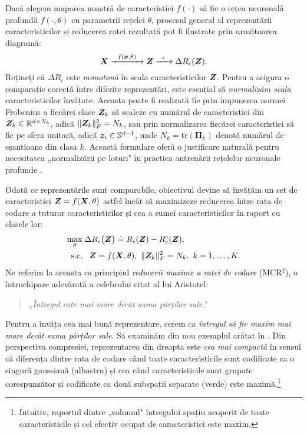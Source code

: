 \documentclass[../../book-main_ro.tex]{subfiles}
\begin{document}
Dacă alegem maparea noastră de caracteristici $f(\cdot)$ să fie o rețea neuronală profundă $f(\cdot,\theta)$ cu parametrii rețelei $\theta$, procesul general al reprezentării caracteristicilor și reducerea ratei rezultată pot fi ilustrate prin următoarea diagramă:
\begin{equation}
	\bm{X}
	\xrightarrow{\hspace{2mm} f(\bm{x}, \theta)\hspace{2mm}} \bm{Z}  \xrightarrow{\hspace{2mm} \epsilon \hspace{2mm}} \Delta R_{\epsilon}(\bm{Z}).
	\label{chap4-eqn:flow}
\end{equation}
Rețineți că $\Delta R_{\epsilon}$ este {\em monotonă} în scala caracteristicilor $\bm{Z}$. Pentru a asigura o comparație corectă între diferite reprezentări, este esențial să {\em normalizăm scala} caracteristicilor învățate. Aceasta poate fi realizată fie prin impunerea normei Frobenius a fiecărei clase $\bm{Z}_k$ să scaleze cu numărul de caracteristici din $\bm{Z}_k \in \mathbb R^{d \times N_k}$, adică $\|\bm{Z}_k\|_F^2 = N_k$, sau prin normalizarea fiecărei caracteristici să fie pe sfera unitară, adică $\bm{z}_i \in \mathbb{S}^{d-1}$, unde $N_k=\mathrm{tr}(\bm \Pi_k)$ denotă numărul de eșantioane din clasa $k$. Această formulare oferă o justificare naturală pentru necesitatea „normalizării pe loturi" în practica antrenării rețelelor neuronale profunde \cite{ioffe2015batch}.

Odată ce reprezentările sunt comparabile, obiectivul devine să învățăm un set de caracteristici $\bm{Z} = f(\bm{X}, \theta)$ astfel încât să maximizeze reducerea între rata de codare a tuturor caracteristicilor și cea a sumei caracteristicilor în raport cu clasele lor:
\begin{equation}
	\begin{aligned}
		\max_{\theta } & \;  \Delta R_{\epsilon}\big(\bm{Z} \big) \doteq R_{\epsilon}(\bm{Z}) - R_{\epsilon}^c(\bm{Z} ), \\
		\mbox{s.c.} & \ \ \, \bm{Z} = f(\bm X, \theta),\  \|\bm{Z}_k\|_F^2 = N_k,\ k=1,\dots,K. 
	\end{aligned}
	\label{eqn:maximal-rate-reduction}
\end{equation}
Ne referim la aceasta ca principiul {\em reducerii maxime a ratei de codare} (MCR$^2$), o întruchipare adevărată a celebrului citat al lui Aristotel:
\begin{quote}
	\centering
	„{\em Întregul este mai mare decât suma părților sale.}"
\end{quote}
Pentru a învăța cea mai bună reprezentare, cerem ca {\em întregul să fie maxim mai mare decât suma părților sale}. Să examinăm din nou exemplul arătat în . Din perspectiva compresiei, reprezentarea din dreapta este {\em cea mai compactă} în sensul că diferența dintre rata de codare când toate caracteristicile sunt codificate ca o singură gaussiană (albastru) și cea când caracteristicile sunt grupate corespunzător și codificate ca două subspații separate (verde) este maximă.\footnote{Intuitiv, raportul dintre „volumul" întregului spațiu acoperit de toate caracteristicile și cel efectiv ocupat de caracteristici este maxim.}
\end{document}
